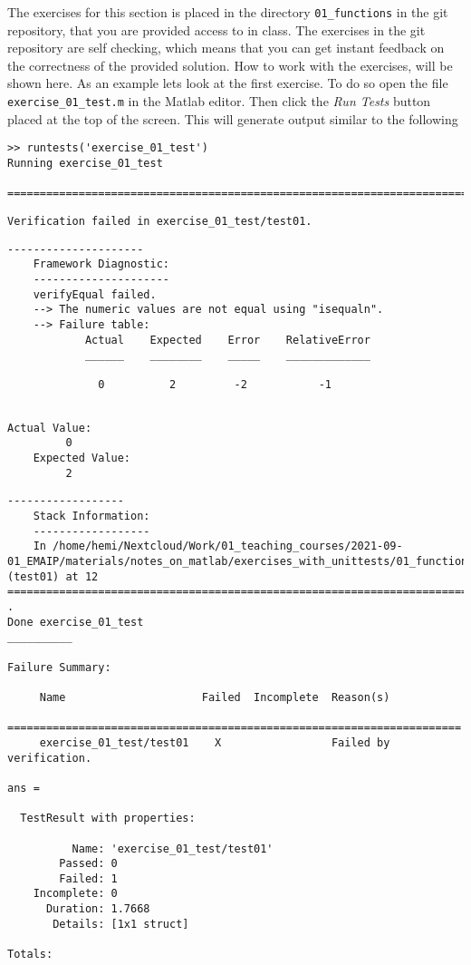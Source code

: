The exercises for this section is placed in the directory 
\verb!01_functions! in the git repository, that you are provided access 
to in class.
The exercises in the git repository are self checking, which means that you 
can get instant feedback on the correctness of the provided solution.
How to work with the exercises, will be shown here. 
As an example lets look at the first exercise.
To do so open the file \verb!exercise_01_test.m! in the Matlab editor.
Then click the \emph{Run Tests} button placed at the top of the screen.
This will generate output similar to the following
\begin{lstlisting}[basicstyle=\tiny]
>> runtests('exercise_01_test')
Running exercise_01_test

================================================================================
\end{lstlisting}
\begin{lstlisting}[basicstyle=\tiny, backgroundcolor=\color{yellow}]
Verification failed in exercise_01_test/test01.
\end{lstlisting}
\begin{lstlisting}[basicstyle=\tiny]
    ---------------------
    Framework Diagnostic:
    ---------------------
    verifyEqual failed.
    --> The numeric values are not equal using "isequaln".
    --> Failure table:
            Actual    Expected    Error    RelativeError
            ______    ________    _____    _____________
        
              0          2         -2           -1      
    
\end{lstlisting}
\begin{lstlisting}[basicstyle=\tiny, backgroundcolor=\color{yellow}]
    Actual Value:
         0
    Expected Value:
         2
\end{lstlisting}
\begin{lstlisting}[basicstyle=\tiny]
    ------------------
    Stack Information:
    ------------------
    In /home/hemi/Nextcloud/Work/01_teaching_courses/2021-09-01_EMAIP/materials/notes_on_matlab/exercises_with_unittests/01_functions/exercise_01_test.m (test01) at 12
================================================================================
.
Done exercise_01_test
__________

Failure Summary:

     Name                     Failed  Incomplete  Reason(s)
    ======================================================================
     exercise_01_test/test01    X                 Failed by verification.

ans = 

  TestResult with properties:

          Name: 'exercise_01_test/test01'
        Passed: 0
        Failed: 1
    Incomplete: 0
      Duration: 1.7668
       Details: [1x1 struct]

Totals:
\end{lstlisting}
